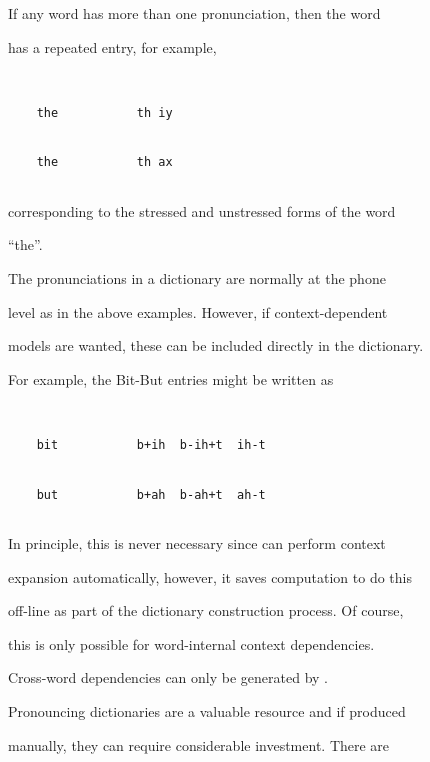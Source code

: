 \noindent


If any word has more than one pronunciation, then the word


has a repeated entry, for example,


\begin{verbatim}


    the           th iy


    the           th ax 


\end{verbatim}


corresponding to the stressed and unstressed forms of the word


``the''.





The pronunciations in a dictionary are normally at the phone


level as in the above examples.  However, if context-dependent


models are wanted, these can be included directly in the dictionary.


For example, the Bit-But entries might be written as


\begin{verbatim}


    bit           b+ih  b-ih+t  ih-t 


    but           b+ah  b-ah+t  ah-t


\end{verbatim}


In principle, this is never necessary since  can perform context


expansion automatically, however, it saves computation to do this


off-line as part of the dictionary construction process.  Of course,


this is only possible for word-internal context dependencies.


Cross-word dependencies can only be generated by .










Pronouncing dictionaries are a valuable resource and if produced


manually, they can require considerable investment.  There are


